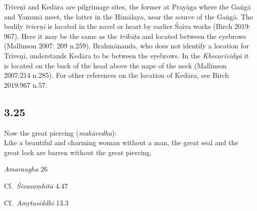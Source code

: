 \begin{ekdosis}
\begin{philcomm}[hp03_024]
Triveṇī and Kedāra are pilgrimage sites, the former at Prayāga where the Gaṅgā and Yamunā meet, the latter in the Himālaya, near the source of the Gaṅgā. The bodily \emph{triveṇī} is located in the navel or heart by earlier Śaiva works (Birch 2019: 967). Here it may be the same as the \emph{trikūṭa} and located between the eyebrows (Mallinson 2007: 209 n.259). Brahmānanda, who does not identify a location for Triveṇī, understands Kedāra to be between the eyebrows. In the \emph{Khecarīvidyā} it is located on the back of the head above the nape of the neck (Mallinson 2007:214 n.285). For other references on the location of Kedāra, see Birch 2019:967 n.57.
\end{philcomm}

\subsection*{3.25}
\begin{translation}[hp03_025]
Now the great piercing (\emph{mahāvedha}):\\
Like a beautiful and charming woman without a man, the great seal and the great lock are barren without the great piercing.\\
\end{translation}

\begin{sources}[hp03_025]
\emph{Amaraugha} 26
\begin{versinnote}
\tl{\var{°bandhau niṣphalau vedhavarjitau ] °bandho niṣphalo vedhavarjitaḥ \vl}\\!}
\end{versinnote}

Cf.~\emph{Śivasaṃhitā} 4.47
\begin{versinnote}
\end{versinnote}

Cf.~\emph{Amṛtasiddhi} 13.3
\begin{versinnote}
\end{versinnote}
\end{sources}


\end{ekdosis}
